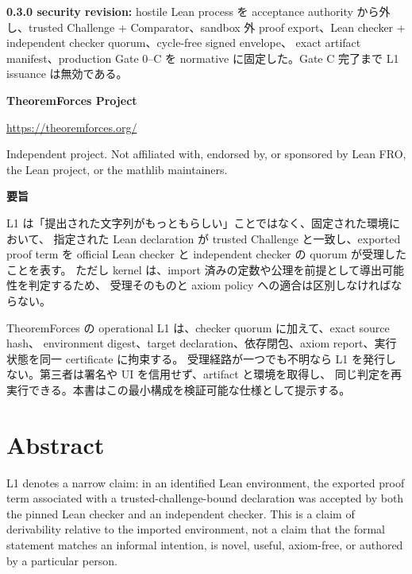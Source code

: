 \documentclass[a4paper,11pt]{ltjsarticle}
\begin{document}
\begin{titlepage}
\begin{tcolorbox}[
  colback=white,colframe=TFLine,boxrule=0.6pt,arc=2mm,
  left=5mm,right=5mm,top=4mm,bottom=4mm]
\medskip
\textbf{0.3.0 security revision:} hostile Lean process を acceptance authority から外し、trusted Challenge +
Comparator、sandbox 外 proof export、Lean checker + independent checker quorum、cycle-free signed envelope、
exact artifact manifest、production Gate 0--C を normative に固定した。Gate C 完了まで L1 issuance は無効である。
\end{tcolorbox}

\vfill
{\sffamily\large\bfseries\color{TFNavy}TheoremForces Project}\par
{\sffamily\color{TFMuted}\url{https://theoremforces.org/}}\par
\vspace{5mm}
{\footnotesize\color{TFMuted}
Independent project. Not affiliated with, endorsed by, or sponsored by Lean FRO,
the Lean project, or the mathlib maintainers.}
\end{titlepage}

\hypersetup{pageanchor=true}

\begin{tcolorbox}[
  colback=TFNavy,colframe=TFNavy,arc=2mm,
  left=5mm,right=5mm,top=4mm,bottom=4mm]
{\sffamily\bfseries\large\color{white}要旨}

\color{white!92}
L1 は「提出された文字列がもっともらしい」ことではなく、固定された環境において、
指定された Lean declaration が trusted Challenge と一致し、exported proof term を official Lean checker と
independent checker の quorum が受理したことを表す。
ただし kernel は、import 済みの定数や公理を前提として導出可能性を判定するため、
受理そのものと axiom policy への適合は区別しなければならない。

TheoremForces の operational L1 は、checker quorum に加えて、exact source hash、
environment digest、target declaration、依存閉包、axiom report、実行状態を同一 certificate に拘束する。
受理経路が一つでも不明なら L1 を発行しない。第三者は署名や UI を信用せず、artifact と環境を取得し、
同じ判定を再実行できる。本書はこの最小構成を検証可能な仕様として提示する。
\end{tcolorbox}

\section*{Abstract}
L1 denotes a narrow claim: in an identified Lean environment, the exported proof term associated with a
trusted-challenge-bound declaration was accepted by both the pinned Lean checker and an independent checker.
This is a claim of derivability relative to
the imported environment, not a claim that the formal statement matches an informal intention, is
novel, useful, axiom-free, or authored by a particular person.
\end{document}
